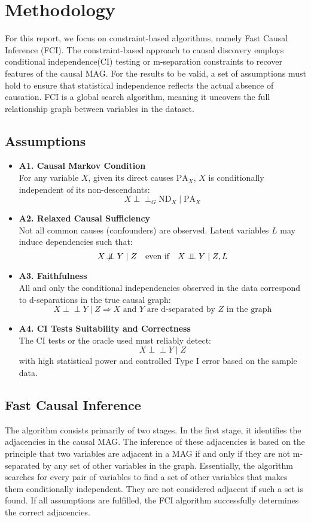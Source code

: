\documentclass[main.tex]{subfiles}
\begin{document}
\section{Methodology}
For this report, we focus on constraint-based algorithms, namely Fast Causal Inference (FCI). The constraint-based approach to causal discovery employs conditional independence(CI) testing or m-separation constraints to recover features of the causal MAG. For the results to be valid, a set of assumptions must hold to ensure that statistical independence reflects the actual absence of causation. FCI is a global search algorithm, meaning it uncovers the full relationship graph between variables in the dataset.
\subsection{Assumptions}
\begin{itemize}
    \item \textbf{A1. Causal Markov Condition} \\
    For any variable \( X \), given its direct causes \( \text{PA}_X \), \( X \) is conditionally independent of its non-descendants:
    \[
    X \perp\!\!\!\perp_{G} \text{ND}_X \mid \text{PA}_X
    \]

    \item \textbf{A2. Relaxed Causal Sufficiency} \\
    Not all common causes (confounders) are observed. Latent variables \( L \) may induce dependencies such that:
    \[
    X \not\!\perp\!\!\!\perp Y \mid Z \quad \text{even if} \quad X \perp\!\!\!\perp Y \mid Z, L
    \]

    \item \textbf{A3. Faithfulness} \\
    All and only the conditional independencies observed in the data correspond to d-separations in the true causal graph:
    \[
    X \perp\!\!\!\perp Y \mid Z \Rightarrow X \text{ and } Y \text{ are d-separated by } Z \text{ in the graph}
    \]

    \item \textbf{A4. CI Tests Suitability and Correctness} \\
    The CI tests or the oracle used must reliably detect:
    \[
    X \perp\!\!\!\perp Y \mid Z
    \]
    with high statistical power and controlled Type I error based on the sample data.
\end{itemize}


\subsection{Fast Causal Inference}
The algorithm consists primarily of two stages. In the first stage, it identifies the adjacencies in the causal MAG. The inference of these adjacencies is based on the principle that two variables are adjacent in a MAG if and only if they are not m-separated by any set of other variables in the graph. Essentially, the algorithm searches for every pair of variables to find a set of other variables that makes them conditionally independent. They are not considered adjacent if such a set is found. If all assumptions are fulfilled, the FCI algorithm successfully determines the correct adjacencies.
\end{document}

